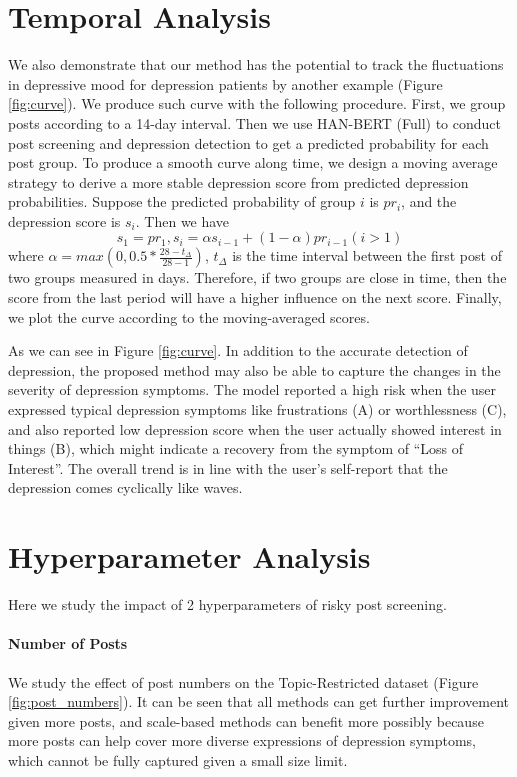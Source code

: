 \documentclass{article}
\begin{document}
\section{Temporal Analysis}

We also demonstrate that our method has the potential to track the fluctuations in depressive mood for depression patients by another example (Figure \ref{fig:curve}). We produce such curve with the following procedure. First, we group posts according to a 14-day interval. Then we use HAN-BERT (Full) to conduct post screening and depression detection to get a predicted probability for each post group. To produce a smooth curve along time, we design a moving average strategy to derive a more stable depression score from predicted depression probabilities. Suppose the predicted probability of group $i$ is $pr_i$, and the depression score is $s_i$. Then we have 
$$s_1 = pr_1, s_i = \alpha s_{i-1} + (1-\alpha) pr_{i-1} (i > 1)$$
where $\alpha = max(0, 0.5 * \frac{28-t_{\Delta}}{28-1})$, $t_{\Delta}$ is the time interval between the first post of two groups measured in days. Therefore, if two groups are close in time, then the score from the last period will have a higher influence on the next score. Finally, we plot the curve according to the moving-averaged scores.


As we can see in Figure \ref{fig:curve}. In addition to the accurate detection of depression, the proposed method may also be able to capture the changes in the severity of depression symptoms. The model reported a high risk when the user expressed typical depression symptoms like frustrations (A) or worthlessness (C), and also reported low depression score when the user actually showed interest in things (B), which might indicate a recovery from the symptom of ``Loss of Interest''. The overall trend is in line with the user's self-report that the depression comes cyclically like waves.

\section{Hyperparameter Analysis}
\label{sec:factor}

Here we study the impact of 2 hyperparameters of risky post screening.

\paragraph{Number of Posts} 
We study the effect of post numbers on the Topic-Restricted dataset (Figure \ref{fig:post_numbers}). It can be seen that all methods can get further improvement given more posts, and scale-based methods can benefit more possibly because more posts can help cover more diverse expressions of depression symptoms, which cannot be fully captured given a small size limit.
\end{document}
